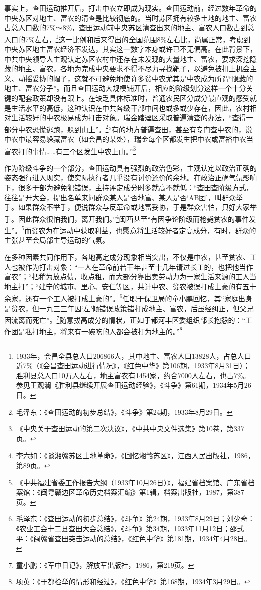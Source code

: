 事实上，查田运动推开后，打击中农立即成为现实。查田运动前，经过数年革命的中央苏区对地主、富农的清查是比较彻底的。当时苏区拥有较多土地的地主、富农占总人口数的7\%～8\%，查田运动前中央苏区清查出来的地主、富农人口数占到总人口的7\%左右，\footnote{1933年，会昌全县总人口206866人，其中地主、富农人口13828人，占总人口近7\%（《会昌查田运动进行情况》，《红色中华》第106期，1933年8月31日）；胜利县总人口10万人左右，地主富农有1454家，约合7000人左右，也占7\%。参见王观澜《胜利县继续开展查田运动经验》，《斗争》第61期，1934年5月26日。}这一比例和后来得出的全国范围8\%左右比，尚属正常，考虑到中央苏区地主富农经济不发达，其实这一数字本身或许已不无偏高。在此背景下，中共中央领导人主观认定苏区农村中还存在未发现的大量地主、富农，要求深挖隐藏的地主、富农，各地为完成中央要求不得不尽力寻找靶子，以避免被扣上机会主义、动摇妥协的帽子，这就不可避免地使许多贫中农尤其是中农成为所谓“隐藏的地主、富农分子”。而且查田运动大规模铺开后，相应的阶级划分这样一个十分关键的配套政策却没有跟上。在缺乏具体标准时，普通农民区分成分最直观的感受就是生活水平的高低，这种认识在中共各级干部中间也或多或少存在，因此，农村相对生活较好的中农极易成为打击对象。瑞金踏迳区采取普遍清查的办法，“查得一部分中农恐慌逃跑，躲到山上”。\footnote{毛泽东：《查田运动的初步总结》，《斗争》第24期，1933年8月29日。}“有的地方普遍查田，甚至有专门查中农的，说中农中最容易躲藏富农（如会昌的某处），瑞金每个区都发生把中农或富裕中农当富农打的事情……有三个区发生中农上山。”\footnote{《中央关于查田运动的第二次决议》，《中共中央文件选集》第10卷，第337页。}


作为阶级斗争的一个部分，查田运动具有强烈的政治色彩，主观认定以政治正确的姿态强行进入现实，使实际执行者几乎没有讨价还价的余地。在政治正确气氛影响下，很多干部为避免犯错误，主持评定成分时多就高不就低：“查田查阶级方式，往往是开大会，提出名单来问群众某人是否地富、某人是否‘AB团’，叫群众举手。如果群众不举手，便说群众与反革命或地富妥协，于是群众害怕，只好大家举手。因此群众很怕我们，离开我们。”\footnote{李六如：《谈湘赣苏区土地革命》，《回忆湘赣苏区》，江西人民出版社，1986，第89页。}闽西甚至“有因争论阶级而枪毙贫农的事件发生”。\footnote{《中共福建省委工作报告大纲（1933年10月26日）》，福建省档案馆、广东省档案馆：《闽粤赣边区革命历史档案汇编》第1辑，档案出版社，1987，第387页。}而贫农为在运动中获取利益，也愿意将生活较好者定高成分，有时，群众的主张甚至会局部主导运动的气氛。


在多种因素共同作用下，各地高定成分现象相当突出，不仅是中农，甚至贫农、工人也被作为打击对象：“一人在革命前若干年甚至十几年请过长工的，也把他当作富农”；“把稍为放点债，收点租，而大部分靠出卖劳动力为一家生活来源的工人当地主打”；“建宁的城市、里心、安仁等区，共计中农、贫农被误打成土豪的有五十余家，还有一个工人被打成土豪的”。\footnote{毛泽东：《查田运动的初步总结》，《斗争》第24期，1933年8月29日；刘少奇：《农业工会十二县查田大会总结》，《斗争》第34期，1933年11月12日；邵式平：《闽赣省查田突击运动的总结》，《红色中华》第181期，1934年4月28日。}任职于保卫局的童小鹏回忆，其“家庭出身是贫农，但一九三三年因‘左’倾错误政策错打成地主、富农，后虽经纠正，但父兄因流离而死亡”。\footnote{童小鹏：《军中日记》，解放军出版社，1986，第219页。}随意拔高成分的情状，正如于都河丰区委组织部长抱怨的：“工作团是私打地主，将来有一碗吃的人都会被打为地主的。”\footnote{项英：《于都检举的情形和经过》，《红色中华》第168期，1934年3月29日。}


